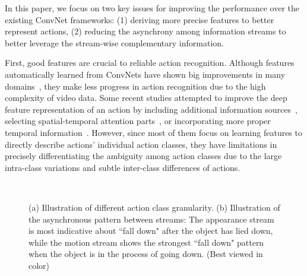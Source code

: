 \documentclass[letterpaper]{article}
\begin{document}
In this paper, we focus on two key issues for improving the performance over the existing ConvNet frameworks: (1) deriving more precise features to better represent actions, (2) reducing the asynchrony among information streams to better leverage the stream-wise complementary information.









First, good features are crucial to reliable action recognition. Although features automatically learned from ConvNets have shown big improvements in many domains~\cite{liu2016two,ImageNet,song2017end}, they make less progress in action recognition due to the high complexity of video data. Some recent studies attempted to improve the deep feature representation of an action by including additional information sources~\cite{dutaspatio,3stream,3stream2}, selecting spatial-temporal attention parts~\cite{kar2016adascan,visualattention,KVMF}, or incorporating more proper temporal information~\cite{TSN,cherian2017generalized}. However, since most of them focus on learning features to directly describe actions' individual action classes, they have limitations in precisely differentiating the ambiguity among action classes due to the large intra-class variations and subtle inter-class differences of actions.

\begin{figure}
  \centering
   \\
  \caption{(a) Illustration of different action class granularity. (b) Illustration of the asynchronous pattern between streams: The appearance stream is most indicative about ``fall down" after the object has lied down, while the motion stream shows the strongest ``fall down" pattern when the object is in the process of going down. (Best viewed in color)} %
\end{figure}
\end{document}
